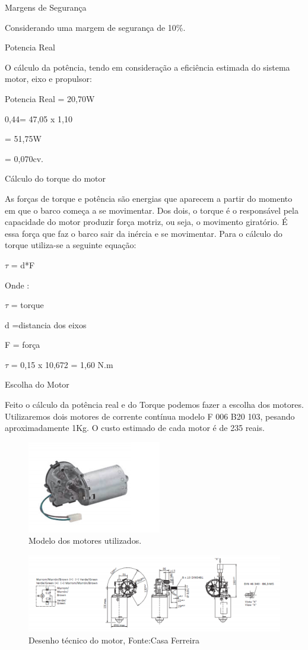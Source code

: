 Margens de Segurança

Considerando uma margem de segurança de 10\%.

Potencia Real

O cálculo da potência, tendo em consideração a eficiência estimada do sistema motor, eixo e propulsor:

Potencia Real = 20,70W

0,44= 47,05 x 1,10 

= 51,75W 

= 0,070cv.


Cálculo do torque do motor

As forças de torque e potência são energias que aparecem a partir do momento em que o barco começa a se movimentar. Dos dois, o torque é o responsável pela capacidade do motor produzir força motriz, ou seja, o movimento giratório. É essa força que faz o barco sair da inércia e se movimentar. Para o cálculo do torque utiliza-se a seguinte equação:
    
    $\tau$ = d*F
    
Onde :

$\tau$ = torque

d =distancia dos eixos

F = força


 $\tau$   = 0,15 x 10,672 = 1,60 N.m

Escolha do Motor

Feito o cálculo da potência real e do Torque podemos fazer a escolha dos motores. Utilizaremos dois motores de corrente contínua modelo F 006 B20 103, pesando aproximadamente 1Kg. O custo estimado de cada motor é de 235 reais. 


\FloatBarrier
\begin{figure} [!htp]
	\centering
	\includegraphics[scale=0.6]{figuras/motor2}
	\caption{Modelo dos motores utilizados.}
	\label{motor2}
\end{figure}
\FloatBarrier

\FloatBarrier
\begin{figure} [!htp]
	\centering
	\includegraphics[scale=0.6]{figuras/cotas}
	\caption{ Desenho técnico do motor, Fonte:Casa Ferreira
}
	\label{cotas}
\end{figure}
\FloatBarrier


